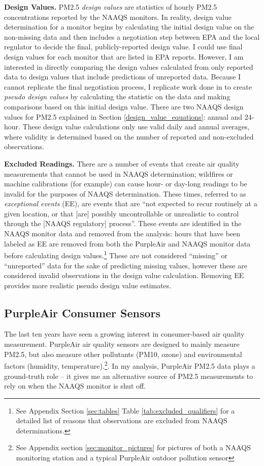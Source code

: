 \documentclass[12pt]{article}
\begin{document}
\textbf{Design Values.} PM2.5 \textit{design values} are statistics of hourly PM2.5 concentrations reported by the NAAQS monitors. In reality, design value determination for a monitor begins by calculating the initial design value on the non-missing data and then includes a negotiation step between EPA and the local regulator to decide the final, publicly-reported design value. I could use final design values for each monitor that are listed in EPA reports. However, I am interested in directly comparing the design values calculated from only reported data to design values that include predictions of unreported data. Because I cannot replicate the final negotiation process, I replicate work done in \citep{fowlieBringingSatelliteBasedAir2019} to create \textit{pseudo design values} by calculating the statistic on the data and making comparisons based on this initial design value. There are two NAAQS design values for PM2.5 explained in Section \ref{design_value_equations}: annual and 24-hour. These design value calculations only use valid daily and annual averages, where validity is determined based on the number of reported and non-excluded observations.

\textbf{Excluded Readings.} There are a number of events that create air quality measurements that cannot be used in NAAQS determination; wildfires or machine calibrations (for example) can cause hour- or day-long readings to be invalid for the purposes of NAAQS determination. These times, referred to as \textit{exceptional events} (EE), are events that are ``not expected to recur routinely at a given location, or that [are] possibly uncontrollable or unrealistic to control through the [NAAQS regulatory] process''\citep{epaEventQualifier1990}. These events are identified in the NAAQS monitor data and removed from the analysis: hours that have been labeled as EE are removed from both the PurpleAir and NAAQS monitor data before calculating design values.\footnote{See Appendix Section \ref{sec:tables} Table \ref{tab:excluded_qualifiers} for a detailed list of reasons that observations are excluded from NAAQS determinations.} These are not considered ``missing'' or ``unreported'' data for the sake of predicting missing values, however these are considered invalid observations in the design value calculation. Removing EE provides more realistic pseudo design value estimates.

\subsection{PurpleAir Consumer Sensors}
The last ten years have seen a growing interest in consumer-based air quality measurement. PurpleAir air quality sensors are designed to mainly measure PM2.5, but also measure other pollutants (PM10, ozone) and environmental factors (humidity, temperature).\footnote{See Appendix section \ref{sec:monitor_pictures} for pictures of both a NAAQS monitoring station and a typical PurpleAir outdoor pollution sensor}. In my analysis, PurpleAir PM2.5 data plays a ground-truth role -- it gives me an alternative source of PM2.5 measurements to rely on when the NAAQS monitor is shut off. 
\end{document}
